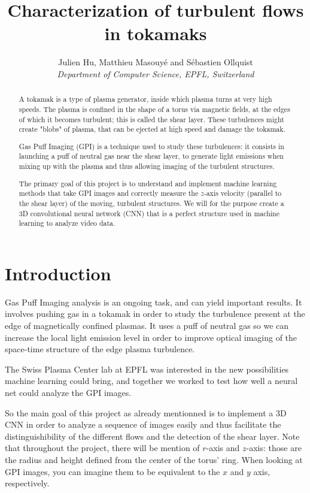 \documentclass[10pt,conference]{IEEEtran}
\begin{document}
\title{Characterization of turbulent flows in tokamaks}

\author{
  Julien Hu, Matthieu Masouyé and Sébastien Ollquist\\
  \textit{Department of Computer Science, EPFL, Switzerland}
}

\maketitle

\begin{abstract}
  A tokamak is a type of plasma generator, inside which plasma turns at very high speeds. The plasma is confined in the shape of a torus via magnetic fields, at the edges of which it becomes turbulent; this is called the shear layer. These turbulences might create "blobs" of plasma, that can be ejected at high speed and damage the tokamak.\par
  Gas Puff Imaging (GPI) is a technique used to study these turbulences: it consists in launching a puff of neutral gas near the shear layer, to generate light emissions when mixing up with the plasma and thus allowing imaging of the turbulent structures.\par
  The primary goal of this project is to understand and implement machine learning methods that take GPI images and correctly measure the $z$-axis velocity (parallel to the shear layer) of the moving, turbulent structures. We will for the purpose create a 3D convolutional neural network (CNN) that is a perfect structure used in machine learning to analyze video data.
\end{abstract}

\section{Introduction}
Gas Puff Imaging analysis is an ongoing task, and can yield important results. It involves pushing gas in a tokamak in order to study the turbulence present at the edge of magnetically confined plasmas. It uses a puff of neutral gas so we can increase the local light emission level in order to improve optical imaging of the space-time structure of the edge plasma turbulence.\par
The Swiss Plasma Center lab at EPFL was interested in the new possibilities machine learning could bring, and together we worked to test how well a neural net could analyze the GPI images.\par
So the main goal of this project as already mentionned is to implement a 3D CNN in order to analyze a sequence of images easily and thus facilitate the distinguishibility of the different flows and the detection of the shear layer. Note that throughout the project, there will be mention of $r$-axis and $z$-axis: those are the radius and height defined from the center of the torus' ring. When looking at GPI images, you can imagine them to be equivalent to the $x$ and $y$ axis, respectively.
\end{document}
